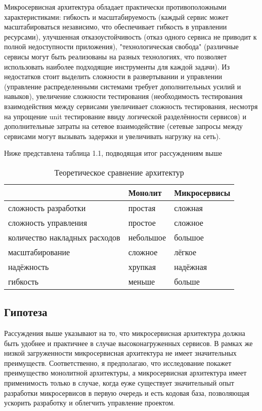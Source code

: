    Микросервисная архитектура обладает практически противоположными характеристиками: гибкость и масштабируемость (каждый сервис может масштабироваться независимо, что обеспечивает гибкость в управлении ресурсами), улучшенная отказоустойчивость (отказ одного сервиса не приводит к полной недоступности приложения), "технологическая свобода" (различные сервисы могут быть реализованы на разных технологиях, что позволяет использовать наиболее подходящие инструменты для каждой задачи). Из недостатков стоит выделить сложности в развертывании и управлении (управление распределенными системами требует дополнительных усилий и навыков), увеличение сложности тестирования (необходимость тестирования взаимодействия между сервисами увеличивает сложность тестирования, несмотря на упрощение unit тестирование ввиду логической разделённости сервисов) и дополнительные затраты на сетевое взаимодействие (сетевые запросы между сервисами могут вызывать задержки и увеличивать нагрузку на сеть).

    Ниже представлена таблица 1.1, подводящая итог рассуждениям выше

    \begin{table}
        \centering
        \begin{tabular}{ p{3cm} p{5cm} p{5cm} }
             & Монолит & Микросервисы \\ \hline
            сложность разработки & простая & сложная \\ \hline
            сложность управления & простое & сложное \\ \hline
            количество накладных расходов & небольшое & большое \\ \hline
            масштабирование & сложное & лёгкое \\ \hline
            надёжность & хрупкая & надёжная \\ \hline
            гибкость & меньше & больше \\
        \end{tabular}
        \caption{Теоретическое сравнение архитектур}
        \label{tab:my_label}
    \end{table}

\subsection{Гипотеза}
    Рассуждения выше указывают на то, что микросервисная архитектура должна быть удобнее и практичнее в случае высоконагруженных сервисов. В рамках же низкой загруженности микросервисная архитектура не имеет значительных преимуществ. Соответственно, я предполагаю, что исследование покажет преимущество монолитной архитектуры, а микросервисная архитектура имеет применимость только в случае, когда еуже существует значительный опыт разработки микросервисов в первую очередь и есть кодовая база, позволяющая ускорить разработку и облегчить управление проектом.
        
\clearpage